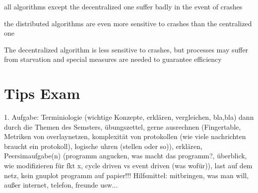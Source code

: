 \documentclass[ngerman,a4paper]{report}
\begin{document}
\begin{compactitem}
	\item all algorithms except the decentralized one suffer badly in the event of crashes
	\item the distributed algorithms are even more sensitive to crashes than the centralized one
	\item The decentralized algorithm is less sensitive to crashes, but processes may suffer from starvation and special measures are needed to guarantee efficiency
\end{compactitem}





\chapter{Tips Exam}
1. Aufgabe: Terminiologie (wichtige Konzepte, erklären, vergleichen, bla,bla)
dann durch die Themen des Semsters, übungszettel, gerne ausrechnen (Fingertable, Metriken von overlaynetzen, komplexität von protokollen (wie viele nachrichten braucht ein protokoll), logische uhren (stellen oder so)), erklären, Peersimaufgabe(n) (programm angucken, was macht das programm?, überblick, wie modifizieren für fkt x, cycle driven vs event driven (was wofür)), last auf dem netz, kein gnuplot programm auf papier!!!
Hilfsmittel: mitbringen, was man will, außer internet, telefon, freunde usw...
\end{document}
